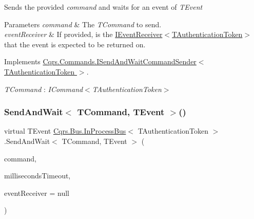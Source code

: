 Sends the provided {\itshape command}  and waits for an event of {\itshape T\+Event}  


\begin{DoxyParams}{Parameters}
{\em command} & The {\itshape T\+Command}  to send.\\
\hline
{\em event\+Receiver} & If provided, is the \hyperlink{interfaceCqrs_1_1Events_1_1IEventReceiver}{I\+Event\+Receiver$<$\+T\+Authentication\+Token$>$} that the event is expected to be returned on.\\
\hline
\end{DoxyParams}


Implements \hyperlink{interfaceCqrs_1_1Commands_1_1ISendAndWaitCommandSender_ab64dd5144f0688b0e23ffe289d4ffa2e_ab64dd5144f0688b0e23ffe289d4ffa2e}{Cqrs.\+Commands.\+I\+Send\+And\+Wait\+Command\+Sender$<$ T\+Authentication\+Token $>$}.

\begin{Desc}
\item[Type Constraints]\begin{description}
\item[{\em T\+Command} : {\em I\+Command$<$T\+Authentication\+Token$>$}]\end{description}
\end{Desc}
\mbox{\label{classCqrs_1_1Bus_1_1InProcessBus_a1b3540fe06b60cd601eaff4ea53f5465_a1b3540fe06b60cd601eaff4ea53f5465}} 
\subsubsection{\texorpdfstring{Send\+And\+Wait$<$ T\+Command, T\+Event $>$()}{SendAndWait< TCommand, TEvent >()}\hspace{0.1cm}{\footnotesize\ttfamily [2/6]}}
{\footnotesize\ttfamily virtual T\+Event \hyperlink{classCqrs_1_1Bus_1_1InProcessBus}{Cqrs.\+Bus.\+In\+Process\+Bus}$<$ T\+Authentication\+Token $>$.Send\+And\+Wait$<$ T\+Command, T\+Event $>$ (\begin{DoxyParamCaption}\item[{T\+Command}]{command,  }\item[{int}]{milliseconds\+Timeout,  }\item[{\hyperlink{interfaceCqrs_1_1Events_1_1IEventReceiver}{I\+Event\+Receiver}$<$ T\+Authentication\+Token $>$}]{event\+Receiver = {\ttfamily null} }\end{DoxyParamCaption})\hspace{0.3cm}{\ttfamily [virtual]}}



